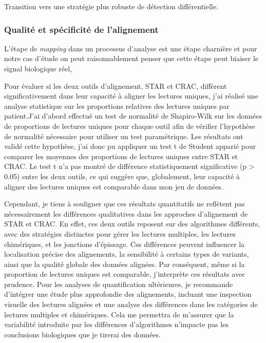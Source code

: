     Transition vers une stratégie plus robuste de détection différentielle.

\subsubsection{Qualité et spécificité de l'alignement}

L'étape de \og \textit{mapping} \fg dans un processus d'analyse est une étape charnière et pour notre cas d'étude on peut raisonnablement penser que cette étape peut biaiser le signal biologique réel, 

Pour évaluer si les deux outils d’alignement, STAR et CRAC, diffèrent significativement dans leur capacité à aligner les lectures uniques,
 j’ai réalisé une analyse statistique sur les proportions relatives des lectures uniques par patient.J’ai d’abord effectué un test de normalité de Shapiro-Wilk sur les données 
 de proportions de lectures uniques pour chaque outil afin de vérifier l’hypothèse de normalité nécessaire pour utiliser un test paramétrique. 
 Les résultats ont validé cette hypothèse, j’ai donc pu appliquer un test t de Student apparié pour comparer les moyennes des proportions de lectures uniques entre STAR et CRAC. 
 Le test t n’a pas montré de différence statistiquement significative (p > 0.05) entre les deux outils, ce qui suggère que, globalement,
  leur capacité à aligner des lectures uniques est comparable dans mon jeu de données.

Cependant, je tiens à souligner que ces résultats quantitatifs ne reflètent pas nécessairement les différences qualitatives dans les approches d’alignement de STAR et CRAC.
 En effet, ces deux outils reposent sur des algorithmes différents, avec des stratégies distinctes pour gérer les lectures multiples, les lectures chimériques, et les jonctions d’épissage. 
 Ces différences peuvent influencer la localisation précise des alignements, la sensibilité à certains types de variants, ainsi que la qualité globale des données alignées.
Par conséquent, même si la proportion de lectures uniques est comparable, j’interprète ces résultats avec prudence. Pour les analyses de quantification ultérieures,
 je recommande d’intégrer une étude plus approfondie des alignements, incluant une inspection visuelle des lectures alignées et une analyse des différences dans les catégories de lectures multiples 
 et chimériques. Cela me permettra de m’assurer que la variabilité introduite par les différences d’algorithmes n’impacte pas les conclusions biologiques que je tirerai des données.
